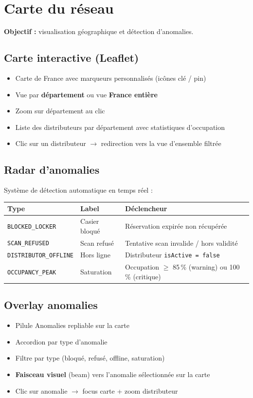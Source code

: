 \documentclass[11pt,a4paper]{article}
\begin{document}
\section{Carte du réseau}

\textbf{Objectif :} visualisation géographique et détection d'anomalies.

\subsection{Carte interactive (Leaflet)}
\begin{itemize}
  \item Carte de France avec marqueurs personnalisés (icônes clé / pin)
  \item Vue par \textbf{département} ou vue \textbf{France entière}
  \item Zoom sur département au clic
  \item Liste des distributeurs par département avec statistiques d'occupation
  \item Clic sur un distributeur $\rightarrow$ redirection vers la vue d'ensemble filtrée
\end{itemize}

\subsection{Radar d'anomalies}
Système de détection automatique en temps réel :

\begin{center}
\begin{tabular}{lll}
  \toprule
  \textbf{Type} & \textbf{Label} & \textbf{Déclencheur} \\
  \midrule
  \texttt{BLOCKED\_LOCKER} & Casier bloqué & Réservation expirée non récupérée \\
  \texttt{SCAN\_REFUSED} & Scan refusé & Tentative scan invalide / hors validité \\
  \texttt{DISTRIBUTOR\_OFFLINE} & Hors ligne & Distributeur \texttt{isActive = false} \\
  \texttt{OCCUPANCY\_PEAK} & Saturation & Occupation $\geq$ 85\,\% (warning) ou 100\,\% (critique) \\
  \bottomrule
\end{tabular}
\end{center}

\subsection{Overlay anomalies}
\begin{itemize}
  \item Pilule \og Anomalies \fg{} repliable sur la carte
  \item Accordion par type d'anomalie
  \item Filtre par type (bloqué, refusé, offline, saturation)
  \item \textbf{Faisceau visuel} (beam) vers l'anomalie sélectionnée sur la carte
  \item Clic sur anomalie $\rightarrow$ focus carte + zoom distributeur
\end{itemize}
\end{document}
